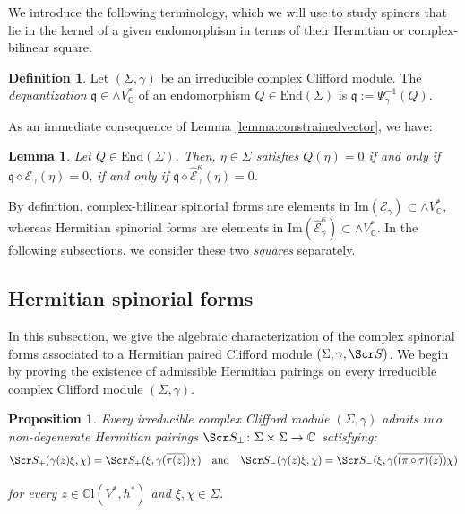 \documentclass[10pt,a4paper,twoside,reqno]{amsart}
\theoremstyle{plain}
\newtheorem{prop}[thm]{Proposition}
\newtheorem{lemma}[thm]{Lemma}
\theoremstyle{definition}
\newtheorem{definition}[thm]{Definition}
\theoremstyle{remark}
\newcommand{\End}{\mathrm{End}}
\def\C{\mathbb{C}}
\def\frq{\mathfrak{q}}
\def\scS{\Scr S}
\def\cE{\mathcal{E}}
\def\hcE{\widehat{\mathcal{E}}}
\def\Im{\mathrm{Im}}
\begin{document}
\noindent
We introduce the following terminology, which we will use to study spinors that lie in the kernel of a given endomorphism in terms of their Hermitian or complex-bilinear square.

\begin{definition}
Let $(\Sigma,\gamma)$ be an irreducible complex Clifford module. The \emph{dequantization} $\frq \in \wedge V^{\ast}_{\C}$ of an endomorphism $Q\in \End(\Sigma)$ is $\frq := \Psi_{\gamma}^{-1}(Q)$.
\end{definition}

\noindent
As an immediate consequence of Lemma \ref{lemma:constrainedvector}, we have:

\begin{lemma}
\label{lemma:constrainedspinoreven}
Let $Q\in \End(\Sigma)$. Then, $\eta\in \Sigma$ satisfies $Q(\eta) = 0$ if and only if $\mathfrak{q}\diamond \cE_{\gamma}(\eta) = 0$, if and only if $\mathfrak{q}\diamond \hcE^{\kappa}_{\gamma}(\eta) = 0$.
\end{lemma}

\noindent
By definition, complex-bilinear spinorial forms are elements in $\Im(\cE_\gamma)\subset \wedge V^*_{\mathbb{C}}$, whereas Hermitian spinorial forms are elements in $\Im(\hcE_\gamma^\kappa)\subset \wedge V^*_{\mathbb{C}}$. In the following subsections, we consider these two \emph{squares} separately.


\subsection{Hermitian spinorial forms}
\label{subsec:Hermitian}


In this subsection, we give the algebraic characterization of the complex spinorial forms associated to a Hermitian paired Clifford module $(\Sigma,\gamma,\scS)$. We begin by proving the existence of admissible Hermitian pairings on every irreducible complex Clifford module $(\Sigma,\gamma)$.  

\begin{prop}
\label{prop:Hermitian_admissible}
Every irreducible complex Clifford module $(\Sigma,\gamma)$ admits two non-degenerate Hermitian pairings $\scS_\pm \colon \Sigma \times \Sigma \to\C$ satisfying: 
\begin{equation}
\label{eq:Hermitian_admissible_Ss}
\scS_+(\gamma(z)\xi,\chi)=\scS_+(\xi,\gamma(\overline{\tau(z)})\chi)\quad\text{and}\quad\scS_-(\gamma(z)\xi,\chi)=\scS_-(\xi,\gamma(\overline{(\pi\circ\tau)(z)})\chi)
\end{equation} 

\noindent
for every $z\in\C\mathrm{l}(V^*,h^*)$ and $\xi,\chi\in\Sigma$. 
\end{prop}
 
\end{document}
